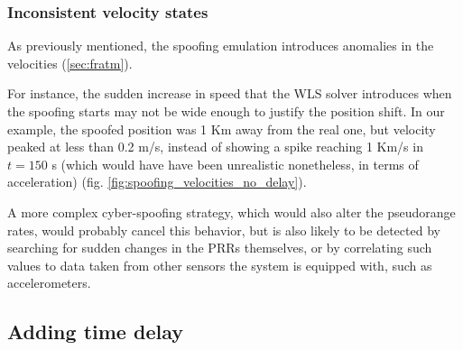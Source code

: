 \subsubsection{Inconsistent velocity states}
As previously mentioned, the spoofing emulation introduces anomalies in the velocities (\ref{sec:fratm}).


For instance, the sudden increase in speed that the WLS solver introduces when the spoofing starts may not be wide enough to justify the position shift. In our example, the spoofed position was 1 Km away from the real one, but velocity peaked at less than 0.2 m/s, instead of showing a spike reaching 1 Km/s in $t = 150$ s (which would have have been unrealistic nonetheless, in terms of acceleration) (fig. \ref{fig:spoofing_velocities_no_delay}).

A more complex cyber-spoofing strategy, which would also alter the pseudorange rates, would probably cancel this behavior, but is also likely to be detected by searching for sudden changes in the PRRs themselves, or by correlating such values to data taken from other sensors the system is equipped with, such as accelerometers.
\subsection{Adding time delay}
\label{subsec:time_delay}

